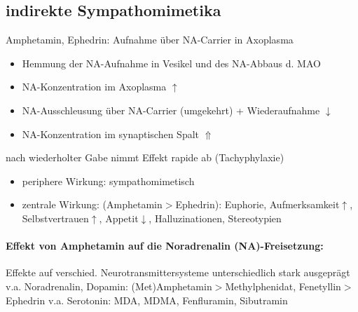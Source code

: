 \documentclass[10pt,a4paper]{report}
\begin{document}
\subsection{indirekte Sympathomimetika}
Amphetamin, Ephedrin: Aufnahme über NA-Carrier in Axoplasma 
\begin{itemize}
	\item Hemmung der NA-Aufnahme in Vesikel und des NA-Abbaus d. MAO 
	\item NA-Konzentration im Axoplasma $\uparrow$
	\item NA-Ausschleusung über NA-Carrier (umgekehrt) + Wiederaufnahme $\downarrow$
	\item NA-Konzentration im synaptischen Spalt $\Uparrow$
\end{itemize}
nach wiederholter Gabe nimmt Effekt rapide ab (Tachyphylaxie)
\begin{itemize}	
	\item periphere Wirkung: sympathomimetisch
	\item zentrale Wirkung: (Amphetamin$>$Ephedrin): Euphorie, Aufmerksamkeit$\uparrow$,	Selbstvertrauen$\uparrow$, Appetit$\downarrow$, Halluzinationen, Stereotypien
\end{itemize}
\paragraph{Effekt von Amphetamin auf die Noradrenalin (NA)-Freisetzung:}
Effekte auf verschied. Neurotransmittersysteme unterschiedlich stark ausgeprägt v.a. Noradrenalin, Dopamin: 
(Met)Amphetamin$>$Methylphenidat, Fenetyllin$>$ Ephedrin
v.a. Serotonin: MDA, MDMA, Fenfluramin, Sibutramin
\end{document}
